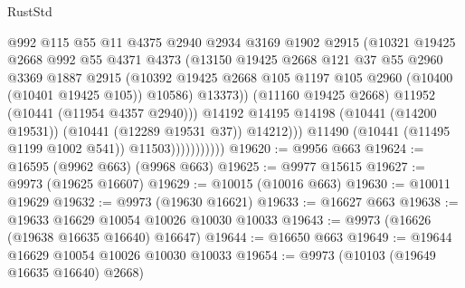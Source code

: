 \begin{lexlean}{RustStd}
\begin{coremodule}
                                  @992
                                  @115
                                  @55
                                  @11
                                  @4375
                                  @2940
                                  @2934
                                  @3169
                                  @1902
                                  @2915
                                  (@10321
                                    @19425
                                    @2668
                                    @992
                                    @55
                                    @4371
                                    @4373
                                    (@13150
                                      @19425
                                      @2668
                                      @121
                                      @37
                                      @55
                                      @2960
                                      @3369
                                      @1887
                                      @2915
                                      (@10392
                                        @19425
                                        @2668
                                        @105
                                        @1197
                                        @105
                                        @2960
                                        (@10400 (@10401 @19425 @105))
                                        @10586)
                                      @13373))
                                  (@11160 @19425 @2668)
                                  @11952
                                  (@10441 (@11954 @4357 @2940)))
                                @14192
                                @14195
                                @14198
                                (@10441 (@14200 @19531))
                                (@10441 (@12289 @19531 @37))
                                @14212)))
                          @11490
                          (@10441 (@11495 @1199 @1002 @541))
                          @11503)))))))))))
@19620 := @9956 @663
@19624 := @16595 (@9962 @663) (@9968 @663)
@19625 := @9977 @15615
@19627 := @9973 (@19625 @16607)
@19629 := @10015 (@10016 @663)
@19630 := @10011 @19629
@19632 := @9973 (@19630 @16621)
@19633 := @16627 @663
@19638 := @19633 @16629 @10054 @10026 @10030 @10033
@19643 := @9973 (@16626 (@19638 @16635 @16640) @16647)
@19644 := @16650 @663
@19649 := @19644 @16629 @10054 @10026 @10030 @10033
@19654 := @9973 (@10103 (@19649 @16635 @16640) @2668)

\end{coremodule}
\end{lexlean}
